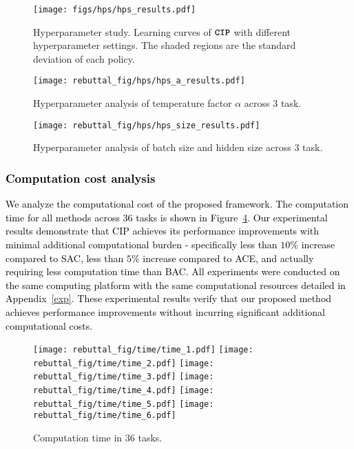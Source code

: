 \begin{figure}[h]
    \centering
    \texttt{[image: figs/hps/hps\_results.pdf]}
    \caption{Hyperparameter study. Learning curves of $\texttt{\textbf{CIP}}$ with different hyperparameter settings. The shaded regions are the standard deviation of each policy.}
    \label{fig:hps}
\end{figure}

\begin{figure}[t]
    \centering
    \texttt{[image: rebuttal\_fig/hps/hps\_a\_results.pdf]}
    \caption{Hyperparameter analysis of temperature factor $\alpha$ across $3$ task.}
    \label{fig:appendix_hps_a}
\end{figure}

\begin{figure}[t]
    \centering
    \texttt{[image: rebuttal\_fig/hps/hps\_size\_results.pdf]}
    \caption{Hyperparameter analysis of batch size and hidden size across $3$ task.}
    \label{fig:appendix_hps_size}
\end{figure}

\textcolor{black}{
\subsubsection{Computation cost analysis}
We analyze the computational cost of the proposed framework. The computation time for all methods across 36 tasks is shown in Figure~\ref{fig:appendix_time}. Our experimental results demonstrate that CIP achieves its performance improvements with minimal additional computational burden - specifically less than $10\%$ increase compared to SAC, less than $5\%$ increase compared to ACE, and actually requiring less computation time than BAC. All experiments were conducted on the same computing platform with the same computational resources detailed in Appendix~\ref{exp}. 
These experimental results verify that our proposed method achieves performance improvements without incurring significant additional computational costs.}

\begin{figure}[t]
    \centering
    \texttt{[image: rebuttal\_fig/time/time\_1.pdf]}
    \texttt{[image: rebuttal\_fig/time/time\_2.pdf]}
    \texttt{[image: rebuttal\_fig/time/time\_3.pdf]}
    \texttt{[image: rebuttal\_fig/time/time\_4.pdf]}
    \texttt{[image: rebuttal\_fig/time/time\_5.pdf]} 
    \texttt{[image: rebuttal\_fig/time/time\_6.pdf]} 
    \caption{Computation time in $36$ tasks.}
    \label{fig:appendix_time}
\end{figure}

